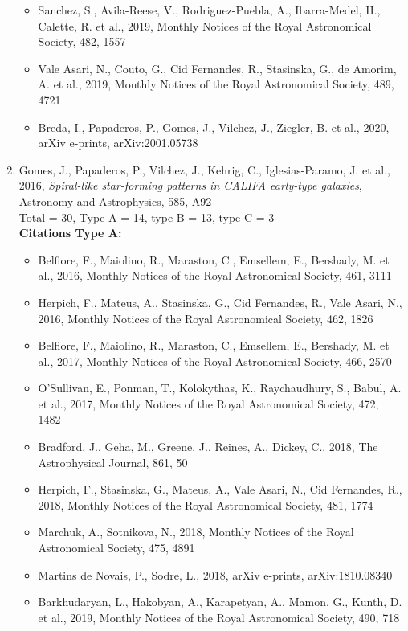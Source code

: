 \documentclass{letter}
\begin{document}
\begin{enumerate}
\begin{itemize}
\item Sanchez, S., Avila-Reese, V., Rodriguez-Puebla, A., Ibarra-Medel, H., Calette, R. et al., 2019, Monthly Notices of the Royal Astronomical Society, 482, 1557
\item Vale Asari, N., Couto, G., Cid Fernandes, R., Stasinska, G., de Amorim, A. et al., 2019, Monthly Notices of the Royal Astronomical Society, 489, 4721
\item Breda, I., Papaderos, P., Gomes, J., Vilchez, J., Ziegler, B. et al., 2020, arXiv e-prints, arXiv:2001.05738
\end{itemize}
\item Gomes, J., Papaderos, P., Vilchez, J., Kehrig, C., Iglesias-Paramo, J. et al., 2016, {\it Spiral-like star-forming patterns in CALIFA early-type galaxies}, Astronomy and Astrophysics, 585, A92 \\ 
Total = 30, Type A = 14, type B = 13, type C = 3 \\ 
{\bf Citations Type A:}
\begin{itemize}
\item Belfiore, F., Maiolino, R., Maraston, C., Emsellem, E., Bershady, M. et al., 2016, Monthly Notices of the Royal Astronomical Society, 461, 3111
\item Herpich, F., Mateus, A., Stasinska, G., Cid Fernandes, R., Vale Asari, N., 2016, Monthly Notices of the Royal Astronomical Society, 462, 1826
\item Belfiore, F., Maiolino, R., Maraston, C., Emsellem, E., Bershady, M. et al., 2017, Monthly Notices of the Royal Astronomical Society, 466, 2570
\item O'Sullivan, E., Ponman, T., Kolokythas, K., Raychaudhury, S., Babul, A. et al., 2017, Monthly Notices of the Royal Astronomical Society, 472, 1482
\item Bradford, J., Geha, M., Greene, J., Reines, A., Dickey, C., 2018, The Astrophysical Journal, 861, 50
\item Herpich, F., Stasinska, G., Mateus, A., Vale Asari, N., Cid Fernandes, R., 2018, Monthly Notices of the Royal Astronomical Society, 481, 1774
\item Marchuk, A., Sotnikova, N., 2018, Monthly Notices of the Royal Astronomical Society, 475, 4891
\item Martins de Novais, P., Sodre, L., 2018, arXiv e-prints, arXiv:1810.08340
\item Barkhudaryan, L., Hakobyan, A., Karapetyan, A., Mamon, G., Kunth, D. et al., 2019, Monthly Notices of the Royal Astronomical Society, 490, 718

\end{itemize}
\end{enumerate}
\end{document}
